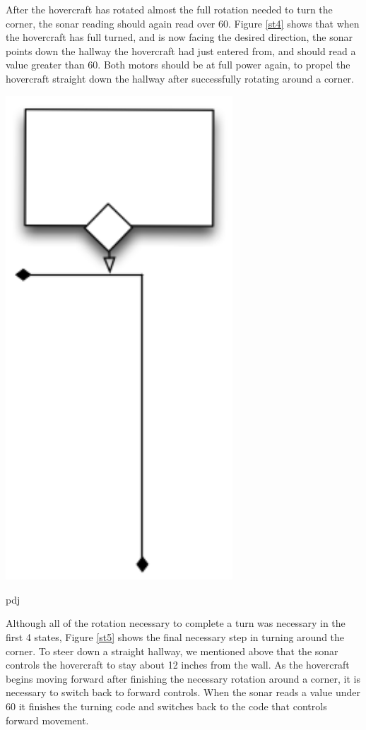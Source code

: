After the hovercraft has rotated almost the full rotation needed to turn the corner, the sonar reading should again read over 60. Figure \ref{st4} shows that when the hovercraft has full turned, and is now facing the desired direction, the sonar points down the hallway the hovercraft had just entered from, and should read a value greater than 60. Both motors should be at full power again, to propel the hovercraft straight down the hallway after successfully rotating around a corner. 
\begin{center}

 \includegraphics[width=85mm]{imageSources/sonarturn5.png}
\end{center}
pdj
\label{st5}

Although all of the rotation necessary to complete a turn was necessary in the first 4 states, Figure \ref{st5} shows the final necessary step in turning around the corner. To steer down a straight hallway, we mentioned above that the sonar controls the hovercraft to stay about 12 inches from the wall. As the hovercraft begins moving forward after finishing the necessary rotation around a corner, it is necessary to switch back to forward controls. When the sonar reads a value under 60 it finishes the turning code and switches back to the code that controls forward movement.